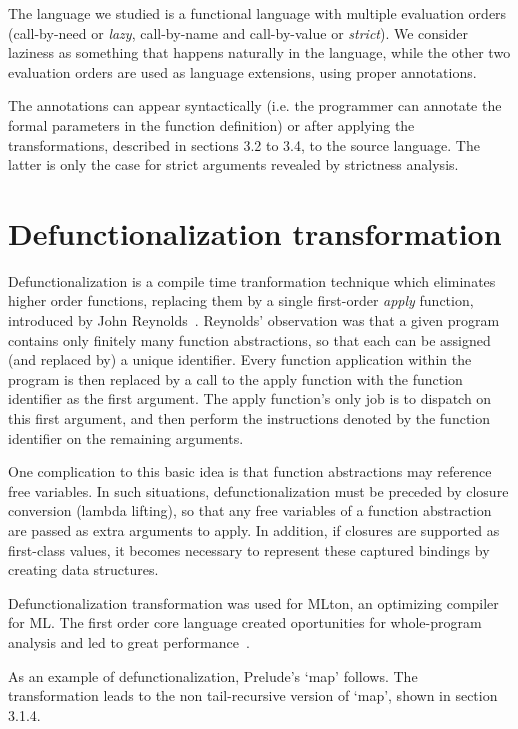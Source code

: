 \documentclass[diploma]{softlab-thesis}
\begin{document}
The language we studied is a functional language 
with multiple evaluation orders (call-by-need or 
\textit{lazy}, call-by-name and call-by-value or \textit{strict}).
We consider laziness as something that happens naturally in the language, while 
the other two evaluation orders are used as language extensions,
using proper annotations.

The annotations can appear syntactically (i.e. the programmer can annotate 
the formal parameters in the function definition) or 
after applying the transformations, described in sections 3.2 to 3.4, 
to the source language. The latter
is only the case for strict arguments revealed by strictness analysis.

\section {Defunctionalization transformation}

Defunctionalization is a compile time tranformation technique which eliminates higher order 
functions, replacing them by a single first-order \textit{apply} function, introduced by John Reynolds~\cite{Reynolds72definitionalinterpreters}.
Reynolds' observation was that a given program contains only finitely many function abstractions, so that each can 
be assigned (and replaced by) a unique identifier. Every function application within the program is then replaced 
by a call to the apply function with the function identifier as the first argument. The apply function's only job is 
to dispatch on this first argument, and then perform the instructions denoted by the function identifier on the 
remaining arguments.

One complication to this basic idea is that function abstractions may reference free variables. In such situations, 
defunctionalization must be preceded by closure conversion (lambda lifting), so that any free variables of a function 
abstraction are passed as extra arguments to apply. In addition, if closures are supported as first-class values, 
it becomes necessary to represent these captured bindings by creating data structures.

Defunctionalization transformation was used for MLton, an optimizing compiler for ML. The first order 
core language created oportunities for whole-program analysis and led to great performance~\cite{mlton}.

As an example of defunctionalization, Prelude's `map' follows. The transformation leads to 
the non tail-recursive version of `map', shown in section 3.1.4.
\end{document}
